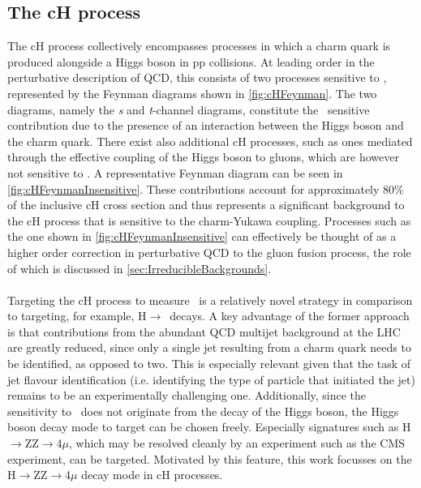 \subsection{The cH process}
\label{sec:thecHProcess}
The cH process collectively encompasses processes in which a charm quark is produced alongside a Higgs boson in pp collisions. At leading order in the perturbative description of QCD, this consists of two processes sensitive to \yc,\,represented by the Feynman diagrams shown in \autoref{fig:cHFeynman}. The two diagrams, namely the \textit{s} and \textit{t}-channel diagrams, constitute the \yc \, sensitive contribution due to the presence of an interaction between the Higgs boson and the charm quark. There exist also additional cH processes, such as ones mediated through the effective coupling of the Higgs boson to gluons, which are however not sensitive to \yc. A representative Feynman diagram can be seen in \autoref{fig:cHFeynmanInsensitive}. These contributions account for approximately 80\% of the inclusive cH cross section and thus represents a significant background to the cH process that is sensitive to the charm-Yukawa coupling. Processes such as the one shown in \autoref{fig:cHFeynmanInsensitive} can effectively be thought of as a higher order correction in perturbative QCD to the gluon fusion process, the role of which is discussed in \autoref{sec:IrreducibleBackgrounds}. \\
\\
Targeting the cH process to measure \yc \, is a relatively novel strategy in comparison to targeting, for example, H$\rightarrow$\ccbar \, decays. A key advantage of the former approach is that contributions from the abundant QCD multijet background at the LHC are greatly reduced, since only a single jet resulting from a charm quark needs to be identified, as opposed to two. This is especially relevant given that the task of jet flavour identification (i.e. identifying the type of particle that initiated the jet) remains to be an experimentally challenging one. Additionally, since the sensitivity to \yc \, does not originate from the decay of the Higgs boson, the Higgs boson decay mode to target can be chosen freely. Especially signatures such as H$\rightarrow$ZZ$\rightarrow$4$\mu$, which may be resolved cleanly by an experiment such as the CMS experiment, can be targeted. Motivated by this feature, this work focusses on the H$\rightarrow$ZZ$\rightarrow$4$\mu$ decay mode in cH processes.\\
\\
